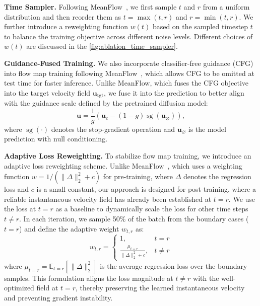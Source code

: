 \documentclass{llmxive}
\providecommand{\myPara}[1]{\noindent\textbf{#1}}
\begin{document}
\myPara{Time Sampler.}
Following MeanFlow~\cite{geng2025mean}, we first sample $t$ and $r$ from a uniform distribution and then reorder them as $t=\max(t,r)$ and $r=\min(t,r)$. We further introduce a reweighting function $w(t)$ based on the sampled timestep $t$ to balance the training objective across different noise levels. Different choices of $w(t)$ are discussed in the \cref{fig:ablation_time_sampler}.


\myPara{Guidance-Fused Training.}
We also incorporate classifier-free guidance (CFG) into flow map training following MeanFlow~\cite{geng2025mean}, which allows CFG to be omitted at test time for faster inference. Unlike MeanFlow, which fuses the CFG objective into the target velocity field $\mathbf{u}_{\text{tgt}}$, we fuse it into the prediction to better align with the guidance scale defined by the pretrained diffusion model:
\begin{equation}
    \mathbf{u} = \frac{1}{g}\left(\mathbf{u}_c - (1-g)\operatorname{sg}(\mathbf{u}_{\varnothing})\right),
  \end{equation}
where $\operatorname{sg}(\cdot)$ denotes the stop-gradient operation and $\mathbf{u}_{\varnothing}$ is the model prediction with null conditioning.

\myPara{Adaptive Loss Reweighting.} To stabilize flow map training, we introduce an adaptive loss reweighting scheme. Unlike MeanFlow~\cite{geng2025mean}, which uses a weighting function $w = 1 / (\|\Delta\|_2^2 + c)$ for pre-training, where $\Delta$ denotes the regression loss and $c$ is a small constant, our approach is designed for post-training, where a reliable instantaneous velocity field has already been established at $t=r$. We use the loss at $t=r$ as a baseline to dynamically scale the loss for other time steps $t \neq r$. In each iteration, we sample 50\% of the batch from the boundary cases ($t=r$) and define the adaptive weight $w_{t,r}$ as:
\begin{equation}
  w_{t,r} =
  \begin{cases} 1, & t = r \\ \displaystyle \frac{\mu_{t=r}}{\|\Delta\|_2^2 + c}, & t \neq r
  \end{cases}
\end{equation}
where $\mu_{t=r} = \mathbb{E}_{t=r} [ \|\Delta\|_2^2 ]$ is the average regression loss over the boundary samples. This formulation aligns the loss magnitude at $t \neq r$ with the well-optimized field at $t=r$, thereby preserving the learned instantaneous velocity and preventing gradient instability.
\end{document}
